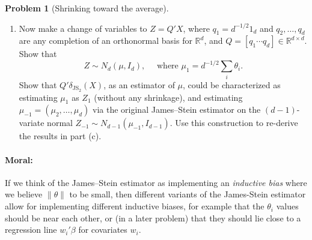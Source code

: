 \documentclass{article}
\newcommand{\RR}{\mathbb{R}}
\theoremstyle{definition}
\newtheorem{problem}{Problem}
\begin{document}
\begin{problem}[Shrinking toward the average]
\begin{enumerate}[label=(\alph*)]
\item Now make a change of variables to $Z = Q'X$, where $q_1 = d^{-1/2}1_d$ and $q_2,\ldots,q_d$ are any completion of an orthonormal basis for $\RR^d$, and $Q= [q_1 \cdots q_d] \in \RR^{d\times d}$. Show that
\[
Z \sim  N_d(\mu, I_d), \quad \text{ where } \mu_1 = d^{-1/2}\sum_i\theta_i.%
\]
Show that $Q'\delta_{\text{JS}_2}(X)$, as an estimator of $\mu$, could be characterized as estimating $\mu_1$ as $Z_1$ (without any shrinkage), and estimating $\mu_{-1}=(\mu_2,\ldots,\mu_d)$ via the original James--Stein estimator on the $(d-1)$-variate normal $Z_{-1} \sim N_{d-1}(\mu_{-1},I_{d-1})$. Use this construction to re-derive the results in part (c).



\end{enumerate}

\paragraph{Moral:} If we think of the James--Stein estimator as implementing an {\em inductive bias} where we believe $\|\theta\|$ to be small, then different variants of the James-Stein estimator allow for implementing different inductive biases, for example that the $\theta_i$ values should be near each other, or (in a later problem) that they should lie close to a regression line $w_i'\beta$ for covariates $w_i$.

\end{problem}




\end{document}
